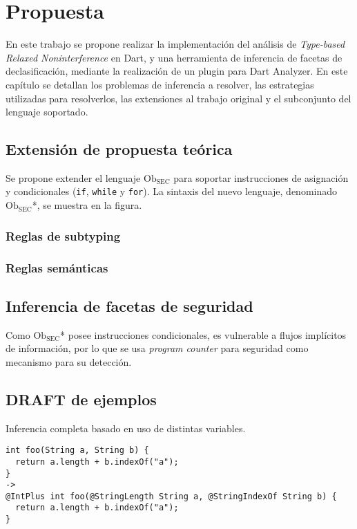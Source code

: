 \chapter{Propuesta}

En este trabajo se propone realizar la implementación del análisis de \textit{Type-based Relaxed Noninterference} en Dart, y una herramienta de inferencia de facetas de declasificación, mediante la realización de un plugin para Dart Analyzer. En este capítulo se detallan los problemas de inferencia a resolver, las estrategias utilizadas para resolverlos, las extensiones al trabajo original y el subconjunto del lenguaje soportado.

\section{Extensión de propuesta teórica}

Se propone extender el lenguaje $\text{Ob}_{\text{SEC}}$ para soportar instrucciones de asignación y condicionales (\texttt{if}, \texttt{while} y \texttt{for}). La sintaxis del nuevo lenguaje, denominado $\text{Ob}_{\text{SEC}}$*, se muestra en la figura.

\subsection{Reglas de subtyping}

\subsection{Reglas semánticas}

\section{Inferencia de facetas de seguridad}

Como $\text{Ob}_{\text{SEC}}$* posee instrucciones condicionales, es vulnerable a flujos implícitos de información, por lo que se usa \textit{program counter} para seguridad como mecanismo para su detección.



\section{DRAFT de ejemplos}

Inferencia completa basado en uso de distintas variables.
 \begin{lstlisting}
int foo(String a, String b) {
  return a.length + b.indexOf("a");
}
->
@IntPlus int foo(@StringLength String a, @StringIndexOf String b) {
  return a.length + b.indexOf("a");
}
 \end{lstlisting}

